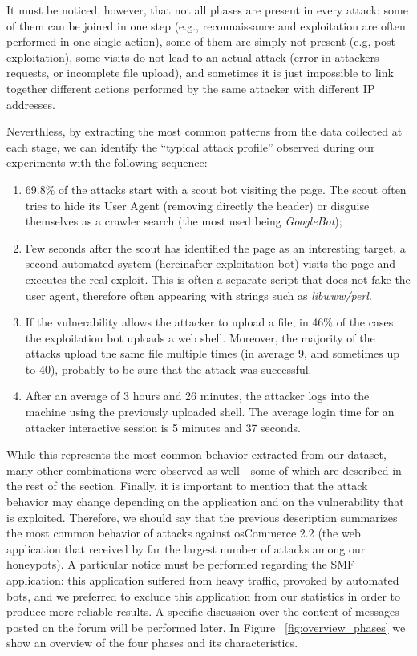 It must be noticed, however, that not all phases are present in every attack: some of them can be joined in one step (e.g., reconnaissance and exploitation are often performed in one single action), some of them are simply not present (e.g, post-exploitation), some visits do not lead to an actual attack (error in attackers requests, or incomplete file upload), and sometimes it is just impossible to link together different actions performed by the same attacker with different IP addresses.

Neverthless, by extracting the most common patterns from the data collected at each stage, we can identify the ``typical attack profile'' observed during our experiments with the following sequence:

\begin{enumerate}
\item
69.8\% of the attacks start with a scout bot visiting the page. The scout often tries to hide its User Agent (removing directly the header) or disguise themselves as a crawler search (the most used being \emph{GoogleBot});
\item
Few seconds after the scout has identified the page as an interesting target, a second automated system (hereinafter exploitation bot) visits the page and executes the real exploit. This is often a separate script that does not fake the user agent, therefore often appearing with strings such as \emph{libwww/perl}.
\item
If the vulnerability allows the attacker to upload a file, in 46\% of the cases the exploitation bot uploads a web shell. Moreover, the majority of the attacks upload the same file multiple times (in average 9, and sometimes up to 40), probably to be sure that the attack was successful.
\item
After an average of 3 hours and 26 minutes, the attacker logs into the machine using the previously uploaded shell. The average login time for an attacker interactive session is 5 minutes and 37 seconds.
\end{enumerate}

While this represents the most common behavior extracted from our dataset, many other combinations were observed as well - some of which are described in the rest of the section. Finally, it is important to mention that the attack behavior may change depending on the application and on the vulnerability that is exploited. Therefore, we should say that the previous description summarizes the most common behavior of attacks against osCommerce 2.2 (the web application that received by far the largest number of attacks among our honeypots). A particular notice must be performed regarding the SMF application: this application suffered from heavy traffic, provoked by automated bots, and we preferred to exclude this application from our statistics in order to produce more reliable results. A specific discussion over the content of messages posted on the forum will be performed later. In Figure ~\ref{fig:overview_phases} we show an overview of the four phases and its characteristics.

